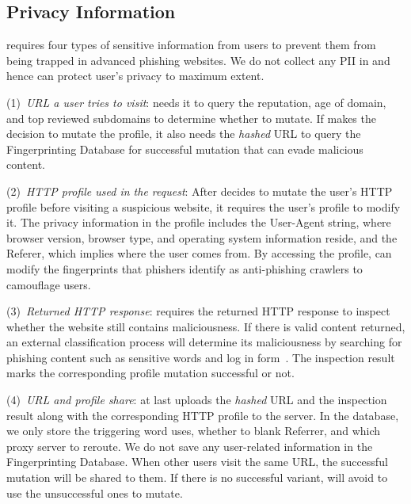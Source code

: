 \subsection{Privacy Information}

\spartacus requires four types of sensitive information from users to prevent them from being trapped in advanced phishing websites.
We do not collect any PII in \spartacus and hence can protect user's privacy to maximum extent.

(1)~\emph{URL a user tries to visit}: \spartacus needs it to query the reputation, age of domain, and top reviewed subdomains to determine whether to mutate.
If \spartacus makes the decision to mutate the profile, it also needs the \emph{hashed} URL to query the Fingerprinting Database for successful mutation that can evade malicious content.

(2)~\emph{HTTP profile used in the request}:
After \spartacus decides to mutate the user's HTTP profile before visiting a suspicious website, it requires the user's profile to modify it.
The privacy information in the profile includes the User-Agent string, where browser version, browser type, and operating system information reside, and the Referer, which implies where the user comes from.
By accessing the profile, \spartacus can modify the fingerprints that phishers identify as anti-phishing crawlers to camouflage users.

(3)~\emph{Returned HTTP response}:
\spartacus requires the returned HTTP response to inspect whether the website still contains maliciousness.
If there is valid content returned,
an external classification process will determine its maliciousness by searching for phishing content such as sensitive words and log in form~\cite{xiang2011cantina+}.
The inspection result marks the corresponding profile mutation successful or not.

(4)~\emph{URL and profile share}:
\spartacus at last uploads the \emph{hashed} URL and the inspection result along with the corresponding HTTP profile to the server.
In the database, we only store the triggering word \spartacus uses, whether to blank Referrer, and which proxy server to reroute.
We do not save any user-related information in the Fingerprinting Database.
When other users visit the same URL, the successful mutation will be shared to them.
If there is no successful variant, \spartacus will avoid to use the unsuccessful ones to mutate.


